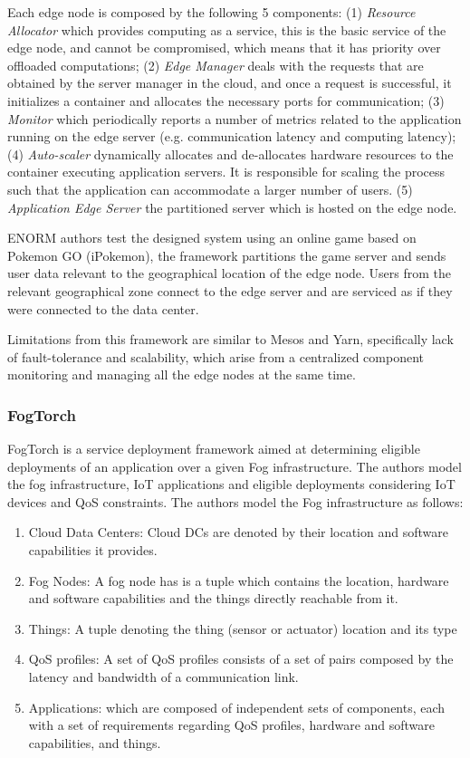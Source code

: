 Each edge node is composed by the following 5 components: (1) \textit{Resource Allocator} which provides computing as a service, this is the basic service of the edge node, and cannot be compromised, which means that it has priority over offloaded computations; (2) \textit{Edge Manager} deals with the requests that are obtained by the server manager in the cloud, and once a request is successful, it initializes a container and allocates the necessary ports for communication; (3) \textit{Monitor} which periodically reports a number of metrics related to the application running on the edge server (e.g. communication latency and computing latency); (4) \textit{Auto-scaler} dynamically allocates and de-allocates hardware resources to the container executing application servers. It is responsible for scaling the process such that the application can accommodate a larger number of users. (5) \textit{Application Edge Server} the partitioned server which is hosted on the edge node.

ENORM authors test the designed system using an online game based on Pokemon GO (iPokemon)\cite{pokemonGo}, the framework partitions the game server and sends  user data relevant to the geographical location of the edge node. Users from the relevant geographical zone connect to the edge server and are serviced as if they were connected to the data center. 

Limitations from this framework are similar to Mesos and Yarn, specifically lack of fault-tolerance and scalability, which arise from a centralized component monitoring and managing all the edge nodes at the same time. 

\subsubsection*{FogTorch}

FogTorch \cite{Brogi2017} is a service deployment framework aimed at determining eligible  deployments of an application over a given Fog infrastructure. The authors model the fog infrastructure, IoT applications and eligible deployments considering IoT devices and QoS constraints. The authors model the Fog infrastructure as follows:

\begin{enumerate}
    \item Cloud Data Centers: Cloud DCs are denoted by their location and software capabilities it provides.
    \item Fog Nodes: A fog node has is a tuple which contains the location, hardware and software capabilities and the things directly reachable from it.
    \item Things: A tuple denoting the thing (sensor or actuator) location and its type
    \item QoS profiles: A set of QoS profiles consists of a set of pairs composed by the latency and bandwidth of a communication link.
    \item Applications: which are composed of independent sets of components,
    each with a set of requirements regarding QoS profiles, hardware and software capabilities, and things.
\end{enumerate}


